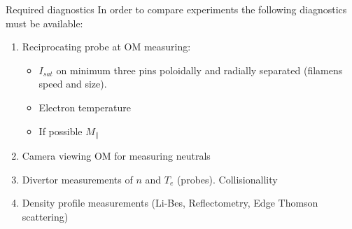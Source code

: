\documentclass[10pt, compress]{beamer}
\begin{document}
\begin{frame}{Required diagnostics}
In order to compare experiments the following diagnostics must be available: 
\begin{enumerate}
	\item Reciprocating probe at OM measuring: 
	\begin{itemize} 
		\item $I_{sat}$  on minimum three pins poloidally and radially separated
		 (filamens speed and size). 
		\item Electron temperature
		\item If possible $M_{\|}$
	 \end{itemize}
	 \item Camera viewing OM for measuring neutrals 
	 \item Divertor measurements of $n$ and $T_e$ (probes). Collisionallity
	 \item Density profile measurements (Li-Bes, Reflectometry, Edge Thomson scattering) 
\end{enumerate}
\end{frame}
\end{document}
